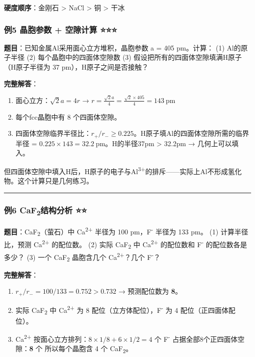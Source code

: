 \textbf{硬度顺序}：金刚石 \textgreater{} NaCl \textgreater{} 铜 \textgreater{} 干冰

\subsubsection{例5 晶胞参数 + 空隙计算 ⭐⭐⭐}\label{ux4f8b5-ux6676ux80deux53c2ux6570-ux7a7aux9699ux8ba1ux7b97}

\textbf{题目}：已知金属Al采用面心立方堆积，晶胞参数 a = 405 pm。计算：
(1) Al的原子半径
(2) 每个晶胞中的四面体空隙数
(3) 假设把所有的四面体空隙填满H原子（H原子半径为 37 pm），H原子之间是否接触？

\textbf{完整解答}：

\begin{enumerate}
\def\labelenumi{(\arabic{enumi})}
\item
  面心立方：\(\sqrt{2}a = 4r\) → \(r = \frac{\sqrt{2}a}{4} = \frac{\sqrt{2} \times 405}{4} = 143\ \mathrm{pm}\)
\item
  每个fcc晶胞中有 8 个四面体空隙。
\item
  四面体空隙临界半径比：\(r_+/r_- \geq 0.225\)。H原子填Al的四面体空隙所需的临界半径 = \(0.225 \times 143 = 32.2\ \mathrm{pm}\)。H的半径37pm \textgreater{} 32.2pm → 几何上可以填入。
\end{enumerate}

但四面体空隙中填入H后，H原子的电子与Al\textsuperscript{3+}的排斥------实际上Al不形成氢化物。这个计算只是几何练习。

\begin{center}\rule{0.5\linewidth}{0.5pt}\end{center}

\subsubsection{\texorpdfstring{例6 CaF\textsubscript{2}结构分析 ⭐⭐}{例6 CaF2结构分析 ⭐⭐}}\label{ux4f8b6-caf2ux7ed3ux6784ux5206ux6790}

\textbf{题目}：CaF\textsubscript{2}（萤石）中 Ca\textsuperscript{2+} 半径为 100 pm，F\textsuperscript{-} 半径为 133 pm。
(1) 计算半径比，预测 Ca\textsuperscript{2+} 的配位数。
(2) 实际 CaF\textsubscript{2} 中 Ca\textsuperscript{2+} 的配位数和 F\textsuperscript{-} 的配位数各是多少？
(3) 一个 CaF\textsubscript{2} 晶胞含几个 Ca\textsuperscript{2+}？几个 F\textsuperscript{-}？

\textbf{完整解答}：

\begin{enumerate}
\def\labelenumi{(\arabic{enumi})}
\item
  \(r_+/r_- = 100/133 = 0.752 > 0.732\) → 预测配位数为 \textbf{8}。
\item
  实际 CaF\textsubscript{2} 中 Ca\textsuperscript{2+} 为 8 配位（立方体配位），F\textsuperscript{-} 为 4 配位（正四面体配位）。
\item
  Ca\textsuperscript{2+} 按面心立方排列：\(8 \times 1/8 + 6 \times 1/2 = 4\) 个
  F\textsuperscript{-} 占据全部8个正四面体空隙：\textbf{8} 个
  所以每个晶胞含 4 个 CaF\textsubscript{2}。
\end{enumerate}

